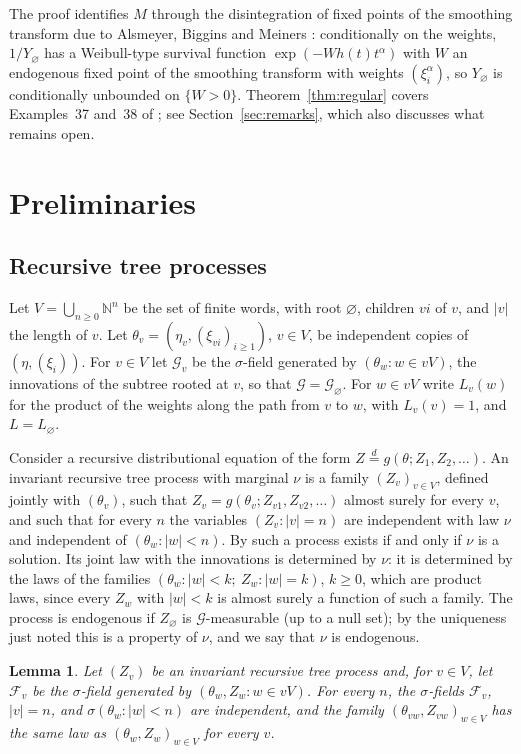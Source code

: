 \documentclass[11pt]{amsart}
\newtheorem{lemma}[theorem]{Lemma}
\theoremstyle{remark}
\newcommand{\Ga}{\mathcal{G}}
\newcommand{\cF}{\mathcal{F}}
\newcommand{\N}{\mathbb{N}}
\begin{document}
The proof identifies $M$ through the disintegration of fixed points of the smoothing
transform due to Alsmeyer, Biggins and Meiners \cite[Theorem~8.3]{ABM}: conditionally on
the weights, $1/Y_\varnothing$ has a Weibull-type survival function
$\exp(-Wh(t)t^{\alpha})$ with $W$ an endogenous fixed point of the smoothing transform with
weights $(\xi_i^{\alpha})$, so $Y_\varnothing$ is conditionally unbounded on $\{W>0\}$.
Theorem~\ref{thm:regular} covers Examples~37 and~38 of \cite{AB}; see
Section~\ref{sec:remarks}, which also discusses what remains open.

\section{Preliminaries}\label{sec:prelim}

\subsection{Recursive tree processes}
Let $V=\bigcup_{n\ge0}\N^n$ be the set of finite words, with root $\varnothing$, children
$vi$ of $v$, and $|v|$ the length of $v$. Let $\theta_v=(\eta_v,(\xi_{vi})_{i\ge1})$,
$v\in V$, be independent copies of $(\eta,(\xi_i))$. For $v\in V$ let $\Ga_v$ be the
$\sigma$-field generated by $(\theta_w: w\in vV)$, the innovations of the subtree rooted at
$v$, so that $\Ga=\Ga_\varnothing$. For $w\in vV$ write $L_v(w)$ for the product of the
weights along the path from $v$ to $w$, with $L_v(v)=1$, and $L=L_\varnothing$.

Consider a recursive distributional equation of the form $Z\stackrel{d}{=}g(\theta;Z_1,Z_2,
\dots)$. An invariant recursive tree process with marginal $\nu$ is a family
$(Z_v)_{v\in V}$, defined jointly with $(\theta_v)$, such that
$Z_v=g(\theta_v;Z_{v1},Z_{v2},\dots)$ almost surely for every $v$, and such that for every
$n$ the variables $(Z_v:|v|=n)$ are independent with law $\nu$ and independent of
$(\theta_w:|w|<n)$. By \cite[Lemma~6]{AB} such a process exists if and only if $\nu$ is a
solution. Its joint law with the innovations is determined by $\nu$: it is determined by
the laws of the families $(\theta_w:|w|<k;\ Z_w:|w|=k)$, $k\ge0$, which are product laws,
since every $Z_w$ with $|w|<k$ is almost surely a function of such a family. The process
is endogenous if $Z_\varnothing$ is $\Ga$-measurable (up to a null set); by the uniqueness
just noted this is a property of $\nu$, and we say that $\nu$ is endogenous.

\begin{lemma}\label{lem:blocks}
Let $(Z_v)$ be an invariant recursive tree process and, for $v\in V$, let
$\cF_v$ be the $\sigma$-field generated by $(\theta_w,Z_w:w\in vV)$. For every $n$, the
$\sigma$-fields $\cF_v$, $|v|=n$, and $\sigma(\theta_w:|w|<n)$ are independent, and the
family $(\theta_{vw},Z_{vw})_{w\in V}$ has the same law as $(\theta_w,Z_w)_{w\in V}$ for
every $v$.
\end{lemma}
\end{document}

